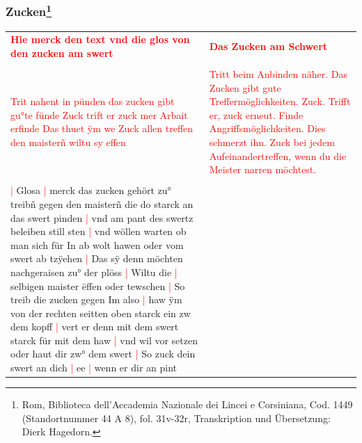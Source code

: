 \newpage

\begin{center}
\end{center}

\newpage

\subsubsection[Zucken]{
    Zucken\footnote{
        \hspace*{0.5ex}Rom, Biblioteca dell'Accademia Nazionale dei Lincei e Corsiniana,
        Cod. 1449 (Standortnummer 44 A 8), fol. 31v-32r, Transkription und Übersetzung: Dierk Hagedorn.}}

\begin{longtable}{p{6.25cm}p{6.25cm}}
    \textbf{\textcolor{red}{
        Hie merck den text vnd die glos von den zucken am swert}}
    &
    \textbf{\textcolor{red}{
        Das Zucken am Schwert}}
    \\
    \\
    \textcolor{red}{
        Trit nahent in pünden
        das zucken gibt gu°te fünde
        Zuck
        trift er zuck mer
        Arbait erfinde
        Das thuet ÿm we
        Zuck allen treffen den maisterñ wiltu sy effen}
    &
    \textcolor{red}{
        Tritt beim Anbinden näher.
        Das Zucken gibt gute Treffermöglichkeiten.
        Zuck.
        Trifft er, zuck erneut.
        Finde Angriffsmöglichkeiten.
        Dies schmerzt ihn.
        Zuck bei jedem Aufeinandertreffen, wenn du die Meister narren möchtest.}
    \\
    \\
    \textcolor{red}{|} Glosa
    \textcolor{red}{|} merck das zucken gehört zu° treibñ gegen den maisterñ die do starck an das swert pinden
    \textcolor{red}{|} vnd am pant des swertz beleiben still sten
    \textcolor{red}{|} vnd wöllen warten ob man sich für In ab wolt hawen oder vom swert ab tzÿehen
    \textcolor{red}{|} Das sÿ denn möchten nachgeraisen zu° der plöss
    \textcolor{red}{|} Wiltu die
    \textcolor{red}{|} selbigen maister ëffen oder tewschen
    \textcolor{red}{|} So treib die zucken gegen Im also
    \textcolor{red}{|} haw ÿm von der rechten seitten oben starck ein zw dem kopff
    \textcolor{red}{|} vert er denn mit dem swert starck für mit dem haw
    \textcolor{red}{|} vnd wil vor setzen oder haut dir zw° dem swert
    \textcolor{red}{|} So zuck dein swert an dich
    \textcolor{red}{|} ee
    \textcolor{red}{|} wenn er dir an pint

\end{longtable}
